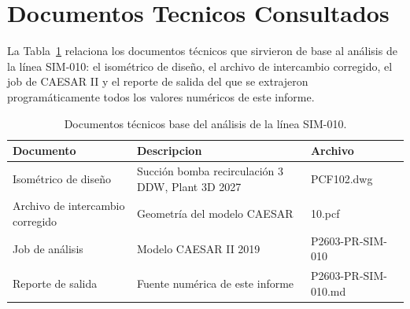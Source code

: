 \appendix
\section{Documentos Tecnicos Consultados}
\label{appendix:documentos}

La Tabla~\ref{tab:planos} relaciona los documentos t\'{e}cnicos que sirvieron
de base al an\'{a}lisis de la l\'{i}nea SIM-010: el isom\'{e}trico de
dise\~{n}o, el archivo de intercambio corregido, el job de CAESAR II y el
reporte de salida del que se extrajeron program\'{a}ticamente todos los valores
num\'{e}ricos de este informe.

\begin{table}[htbp]
    \centering
    \footnotesize
    \caption{Documentos t\'{e}cnicos base del an\'{a}lisis de la l\'{i}nea SIM-010.}
    \label{tab:planos}
    \begin{tabular}{@{}lll@{}}
        \toprule
        \textbf{Documento} & \textbf{Descripcion} & \textbf{Archivo} \\
        \midrule
        Isom\'{e}trico de dise\~{n}o & Succión bomba recirculaci\'{o}n 3 DDW, Plant 3D 2027 & PCF102.dwg \\
        Archivo de intercambio corregido & Geometr\'{i}a del modelo CAESAR & 10.pcf \\
        Job de an\'{a}lisis & Modelo CAESAR II 2019 & P2603-PR-SIM-010 \\
        Reporte de salida & Fuente num\'{e}rica de este informe & P2603-PR-SIM-010.md \\
        \bottomrule
    \end{tabular}
\end{table}
